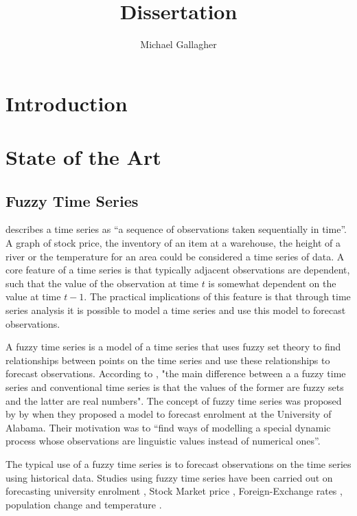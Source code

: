 \documentclass{article}
\title{Dissertation}
\author{Michael Gallagher}
\theoremstyle{definition}
\begin{document}
\maketitle

\tableofcontents

\section{Introduction}

\section{State of the Art}

\subsection{Fuzzy Time Series}

\cite{box2013time} describes a time series as ``a sequence of observations taken sequentially in time''. A graph of stock price, the inventory of an item at a warehouse, the height of a river or the temperature for an area could be considered a time series of data. A core feature of a time series is that typically adjacent observations are dependent, such that the value of the observation at time $t$ is somewhat dependent on the value at time $t-1$. The practical implications of this feature is that through time series analysis it is possible to model a time series and use this model to forecast observations.

A fuzzy time series is a model of a time series that uses fuzzy set theory to find relationships between points on the time series and use these relationships to forecast observations. According to \cite{chen1996forecasting}, "the main difference between a a fuzzy time series and conventional time series is that the values of the former are fuzzy sets and the latter are real numbers". The concept of fuzzy time series was proposed by by \cite{song1993forecasting, song1994forecasting} when they proposed a model to forecast enrolment at the University of Alabama. Their motivation was to ``find ways of modelling a special dynamic process whose observations are linguistic values instead of numerical ones''. 

The typical use of a fuzzy time series is to forecast observations on the time series using historical data. Studies using fuzzy time series have been carried out on forecasting university enrolment \citep{song1993forecasting, song1994forecasting, chen1996forecasting, chen2002forecasting, chen2004new, cheng2006trend, lee2006pattern, huarng2006ratio, tsaur2012fuzzy}, Stock Market price \citep{huarng2005type, cheng2006trend, lee2006pattern, huarng2006ratio, Chen2007fib, chu2009fuzzy}, Foreign-Exchange rates \citep{tsaur2012fuzzy}, population change \citep{tsai1999study} and temperature \citep{temperatureprediction2000, lee2006pattern}.
\end{document}
